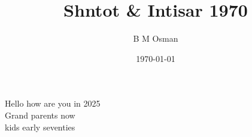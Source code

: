 \documentclass{article}
\title{Shntot \& Intisar 1970}
\author{B M Osman}
\date{\today}
\begin{document}
\maketitle
\begin{center}
Hello how are you in 2025 \\


Grand parents now\\
kids early seventies 

\end{center}
\end{document}
